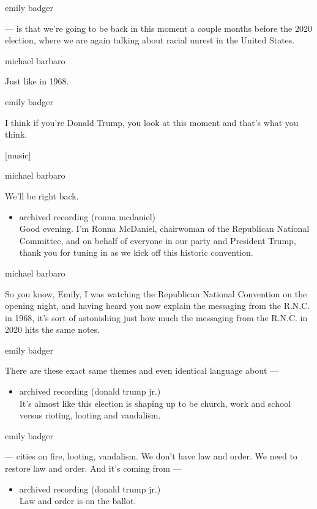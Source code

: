 emily badger

--- is that we're going to be back in this moment a couple months before
the 2020 election, where we are again talking about racial unrest in the
United States.

michael barbaro

Just like in 1968.

emily badger

I think if you're Donald Trump, you look at this moment and that's what
you think.

{[}music{]}

michael barbaro

We'll be right back.

\begin{itemize}
\tightlist
\item
  archived recording (ronna mcdaniel)\\
  Good evening. I'm Ronna McDaniel, chairwoman of the Republican
  National Committee, and on behalf of everyone in our party and
  President Trump, thank you for tuning in as we kick off this historic
  convention.
\end{itemize}

michael barbaro

So you know, Emily, I was watching the Republican National Convention on
the opening night, and having heard you now explain the messaging from
the R.N.C. in 1968, it's sort of astonishing just how much the messaging
from the R.N.C. in 2020 hits the same notes.

emily badger

There are these exact same themes and even identical language about ---

\begin{itemize}
\tightlist
\item
  archived recording (donald trump jr.)\\
  It's almost like this election is shaping up to be church, work and
  school versus rioting, looting and vandalism.
\end{itemize}

emily badger

--- cities on fire, looting, vandalism. We don't have law and order. We
need to restore law and order. And it's coming from ---

\begin{itemize}
\tightlist
\item
  archived recording (donald trump jr.)\\
  Law and order is on the ballot.
\end{itemize}

